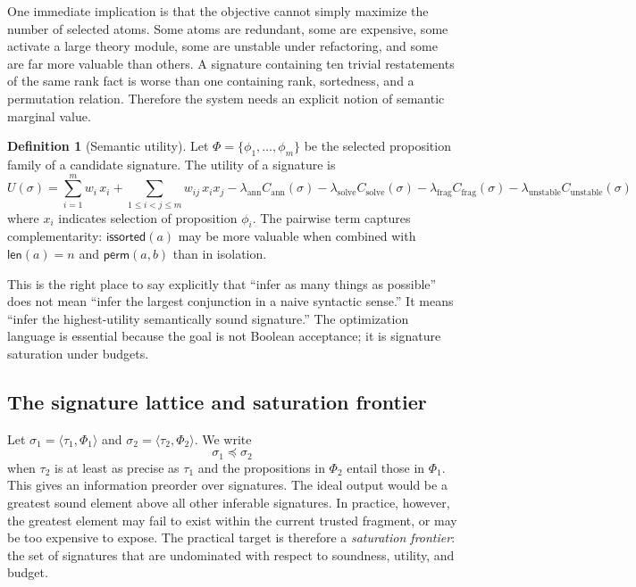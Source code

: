 \documentclass[11pt]{article}
\theoremstyle{definition}
\newtheorem{definition}{Definition}[section]
\theoremstyle{plain}
\begin{document}
One immediate implication is that the objective cannot simply maximize the number
of selected atoms. Some atoms are redundant, some are expensive, some activate a
large theory module, some are unstable under refactoring, and some are far more
valuable than others. A signature containing ten trivial restatements of the same
rank fact is worse than one containing rank, sortedness, and a permutation
relation. Therefore the system needs an explicit notion of semantic marginal
value.

\begin{definition}[Semantic utility]
Let $\Phi = \{\phi_1, \ldots, \phi_m\}$ be the selected proposition family of a
candidate signature. The utility of a signature is
\[
U(\sigma)
= \sum_{i=1}^m w_i\,x_i
+ \sum_{1 \le i < j \le m} w_{ij}\,x_i x_j
- \lambda_{\mathrm{ann}} C_{\mathrm{ann}}(\sigma)
- \lambda_{\mathrm{solve}} C_{\mathrm{solve}}(\sigma)
- \lambda_{\mathrm{frag}} C_{\mathrm{frag}}(\sigma)
- \lambda_{\mathrm{unstable}} C_{\mathrm{unstable}}(\sigma)
\]
where $x_i$ indicates selection of proposition $\phi_i$. The pairwise term
captures complementarity: \(\mathsf{issorted}(a)\) may be more valuable when
combined with \(\mathsf{len}(a)=n\) and \(\mathsf{perm}(a,b)\) than in
isolation.
\end{definition}

This is the right place to say explicitly that ``infer as many things as
possible'' does not mean ``infer the largest conjunction in a naive syntactic
sense.'' It means ``infer the highest-utility semantically sound signature.''
The optimization language is essential because the goal is not Boolean
acceptance; it is signature saturation under budgets.

\subsection{The signature lattice and saturation frontier}
Let $\sigma_1 = \langle \tau_1, \Phi_1 \rangle$ and
$\sigma_2 = \langle \tau_2, \Phi_2 \rangle$. We write
\[
\sigma_1 \preceq \sigma_2
\]
when $\tau_2$ is at least as precise as $\tau_1$ and the propositions in
$\Phi_2$ entail those in $\Phi_1$. This gives an information preorder over
signatures. The ideal output would be a greatest sound element above all other
inferable signatures. In practice, however, the greatest element may fail to
exist within the current trusted fragment, or may be too expensive to expose.
The practical target is therefore a \emph{saturation frontier}: the set of
signatures that are undominated with respect to soundness, utility, and budget.
\end{document}
